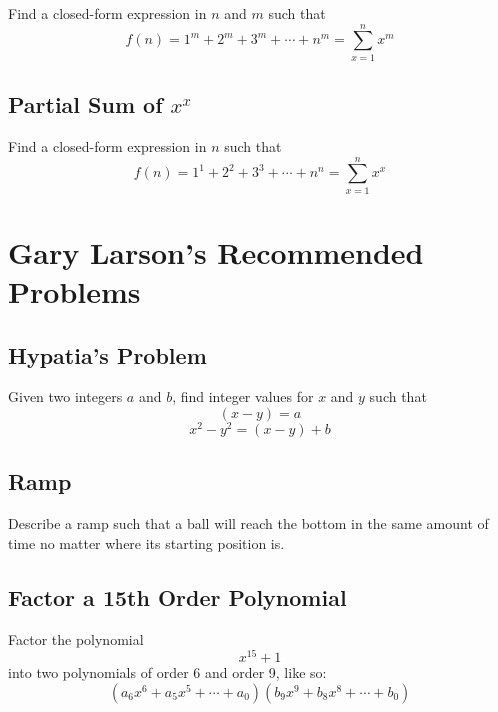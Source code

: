 \documentclass[letterpaper, 11pt]{report}
\numberwithin{equation}{section}
\begin{document}
			
			Find a closed-form expression in $ n $ and $ m $ such that
			\begin{equation}
				f(n) = 1^m + 2^m + 3^m + \cdots + n^m = \sum_{x=1}^{n} x^m
			\end{equation}
			
			
		\section{Partial Sum of $ x^x $}
			
			
			Find a closed-form expression in $ n $ such that
			\begin{equation}
				f(n) = 1^1 + 2^2 + 3^3 + \cdots + n^n = \sum_{x=1}^{n} x^x
			\end{equation}
			
			
	
	
	\chapter{Gary Larson's Recommended Problems}
		
		
		
		\section{Hypatia's Problem}
			
			
			Given two integers \(a\) and \(b\), find integer values for \(x\) and \(y\) such that
			\begin{equation}
				(x-y) = a
			\end{equation}
			\begin{equation}
				x^2 - y^2 = (x-y) + b
			\end{equation}
			
			
		\section{Ramp}
			
			
			Describe a ramp such that a ball will reach the bottom in the same amount of time no matter where its starting position is.
			
			
		\section{Factor a 15th Order Polynomial}
			
			
			Factor the polynomial
			\begin{equation}
				x^{15} + 1
			\end{equation}
			into two polynomials of order 6 and order 9, like so:
			\begin{equation}
				(a_6x^6 + a_5x^5 + \cdots + a_0)(b_9x^9 + b_8x^8 + \cdots + b_0)
			\end{equation}
			
\end{document}
